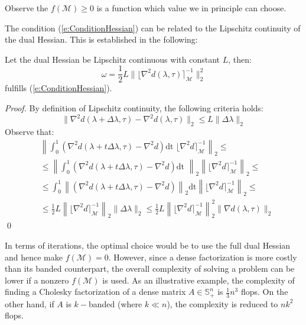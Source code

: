 \begin{remark}
Observe the $f(\mathcal{M}) \geq 0$ is a function which value we in principle can choose.
\end{remark}
The condition (\ref{e:ConditionHessian}) can be related to the Lipschitz continuity of the dual Hessian. This is established in the following:
\begin{proposition}
Let the dual Hessian be Lipschitz continuous with constant $L$, then:
\begin{equation}
\omega = \frac{1}{2} L \| \lfloor \nabla^2 d(\lambda, \tau) \rceil_{\mathcal{M}}^{-1} \|_2^2
\end{equation}
fulfills (\ref{e:ConditionHessian}).
\end{proposition}
\begin{proof}
By definition of Lipschitz continuity, the following criteria holds:
\begin{equation}
\| \nabla^2 d(\lambda + \Delta \lambda, \tau) - \nabla^2 d(\lambda, \tau) \|_2 \leq L \| \Delta \lambda \|_2
\end{equation} 
Observe that:
\begin{equation}
\begin{aligned}
& \left\| \int_0^1 ( \nabla^2 d(\lambda + t \Delta \lambda, \tau) - \nabla^2 d ) \text{dt } \lfloor \nabla^2 d \rceil_{\mathcal{M}}^{-1} \right\|_2 \leq \\
& \leq \left\| \int_0^1 ( \nabla^2 d(\lambda + t \Delta \lambda, \tau) - \nabla^2 d ) \text{dt } \right\|_2 \left\| \lfloor \nabla^2 d \rceil_{\mathcal{M}}^{-1} \right\|_2 \leq \\
& \leq \int_0^1 \left\| ( \nabla^2 d(\lambda + t \Delta \lambda, \tau) - \nabla^2 d ) \right\|_2 \text{dt} \left\| \lfloor \nabla^2 d \rceil_{\mathcal{M}}^{-1} \right\|_2 \leq \\
& \leq \frac{1}{2} L \left\| \lfloor \nabla^2 d \rceil_{\mathcal{M}}^{-1} \right\|_2 \| \Delta \lambda \|_2 \leq \frac{1}{2} L \left\| \lfloor \nabla^2 d \rceil_{\mathcal{M}}^{-1} \right\|_2^2 \| \nabla d(\lambda, \tau) \|_2
\end{aligned}
\end{equation}
\qed
\end{proof}

In terms of iterations, the optimal choice would be to use the full dual Hessian and hence make $f(\mathcal{M}) = 0$. However, since a dense factorization is more costly than its banded counterpart, the overall complexity of solving a problem can be lower if a nonzero $f(\mathcal{M})$ is used. As an illustrative example, the complexity of finding a Cholesky factorization of a dense matrix $A \in \mathbb{S}_{+}^n$ is $\frac{1}{3}n^3$ flops. On the other hand, if $A$ is $k-$banded (where $k \ll n$), the complexity is reduced to $nk^2$ flops.


